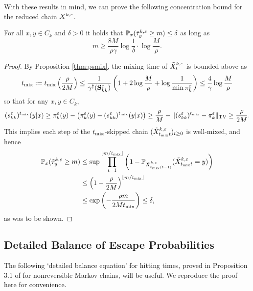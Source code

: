 With these results in mind, we can prove the following concentration bound for the reduced chain $\tilde{X}^{k,\varepsilon}$.

\begin{lemma}\label{thm:reduce}
For all $x,y\in C_k$ and $\delta>0$ it holds that $\mathbb{P}_x(\tilde{\tau}_y^{k,\varepsilon} \ge m) \le\delta$ as long as
\begin{equation}\label{eq:mbound}
m \ge \frac{8M}{\rho\gamma} \log\frac{1}{\delta}\cdot \log\frac{M}{\rho}.
\end{equation}
\end{lemma}

\begin{proof}
By Proposition \ref{thm:psmix}, the mixing time of $\tilde{X}_t^{k,\varepsilon}$ is bounded above as
\begin{align*}
t_{\operatorname{mix}} := t_{\operatorname{mix}}\left(\frac{\rho}{2M}\right) \le \frac{1}{\gamma^\dagger(\mathbf{S}_{kk}^\varepsilon)} \left(1+2\log\frac{M}{\rho}+\log\frac{1}{\min \pi_k^\varepsilon}\right) \le \frac{4}{\gamma}\log\frac{M}{\rho}
\end{align*}
so that for any $x,y\in C_k$,
\begin{align*}
(s_{kk}^\varepsilon)^{t_{\operatorname{mix}}}(y|x) \ge \pi_k^\varepsilon(y) - \left(\pi_k^\varepsilon(y) - (s_{kk}^\varepsilon)^{t_{\operatorname{mix}}}(y|x)\right) \ge \frac{\rho}{M} - \lVert(s_{kk}^\varepsilon)^{t_{\operatorname{mix}}} - \pi_k^\varepsilon\rVert_{\operatorname{TV}} \ge \frac{\rho}{2M}.
\end{align*}
This implies each step of the $t_{\operatorname{mix}}$-skipped chain $(\tilde{X}_{t_{\operatorname{mix}}t}^{k,\varepsilon})_{t\ge 0}$ is well-mixed, and hence
\begin{align*}
\mathbb{P}_x(\tilde{\tau}_y^{k,\varepsilon} \ge m) &\le \sup\prod_{t=1}^{\lfloor m/t_{\operatorname{mix}}\rfloor} \left(1- \mathbb{P}_{\tilde{X}_{t_{\operatorname{mix}}(t-1)}^{k,\varepsilon}} (\tilde{X}_{t_{\operatorname{mix}}t}^{k,\varepsilon} = y)\right)\\
&\le \left(1-\frac{\rho}{2M}\right)^{\lfloor m/t_{\operatorname{mix}}\rfloor}\\
&\le \exp\left(-\frac{\rho m}{2Mt_{\operatorname{mix}}} \right) \le\delta,
\end{align*}
as was to be shown.
\end{proof}


\subsection{Detailed Balance of Escape Probabilities}

The following `detailed balance equation' for hitting times, proved in Proposition 3.1 of \citet{Betz16} for nonreversible Markov chains, will be useful. We reproduce the proof here for convenience.

